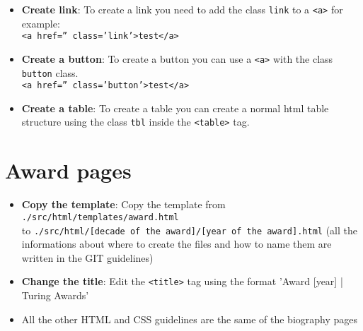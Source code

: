 \documentclass[a4paper,12pt]{article}
\newcommand{\<}{\textless}
\renewcommand{\>}{\textgreater}
\begin{document}
\begin{itemize}
 \item \textbf{Create link}: To create a link you need to add the class \texttt{link} to a \texttt{<a>} for example:\\
 \texttt{<a href='' class='link'>test</a>}
 
 \item \textbf{Create a button}: To create a button you can use a \texttt{<a>} with the class \texttt{button} class.\\
 \texttt{<a href='' class='button'>test</a>}
 
 \item \textbf{Create a table}: To create a table you can create a normal html table structure using the class \texttt{tbl} inside the \texttt{<table>} tag.
\end{itemize}


\section{Award pages}

\begin{itemize}
 \item \textbf{Copy the template}: Copy the template from\\ \texttt{./src/html/templates/award.html}\\ to \texttt{./src/html/[decade of the award]/[year of the award].html} (all the informations about where to create the files and how to name them are written in the GIT guidelines)
 
 \item \textbf{Change the title}: Edit the \texttt{\<title\>} tag using the format 'Award [year] | Turing Awards'
 
 \item All the other HTML and CSS guidelines are the same of the biography pages
\end{itemize}
\end{document}
